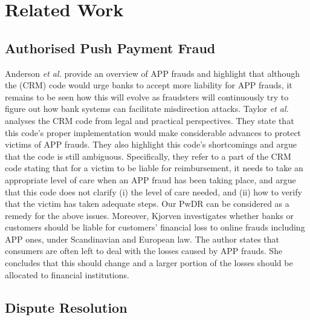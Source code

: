 
\section{Related Work}\label{sec::related-work}


\subsection{Authorised Push Payment Fraud}



Anderson \textit{et al.} \cite{anderson2019measuring} provide an overview of APP frauds and highlight that although  the (CRM) code would urge  banks to accept more liability for APP frauds, it remains to be seen how this will evolve as   fraudsters will continuously try to figure out how bank systems can facilitate misdirection attacks. Taylor \textit{et al.} \cite{taylor2020new} analyses the CRM code from legal and practical perspectives. They  state that this code's proper implementation would make considerable advances to protect victims of APP frauds. They also highlight this code's shortcomings and argue that the code is still ambiguous. Specifically, they refer to a part of the  CRM code  stating that for a victim to be liable for reimbursement,  it needs to take an appropriate level of  care when an APP fraud has been taking place, and argue that   this  code does not  clarify (i)  the level of care needed,  and (ii) how to verify that the victim has taken adequate steps. Our PwDR  can be considered as a remedy for the above issues.   Moreover, Kjorven \cite{kjorven2020pays} investigates whether banks or customers should be liable for customers' financial loss to online  frauds including APP ones, under Scandinavian and European law. The author states  that consumers are often left to deal with the losses caused by APP frauds. She concludes that this should change and  a larger portion of the losses should be allocated to financial institutions.


\subsection{Dispute Resolution}

